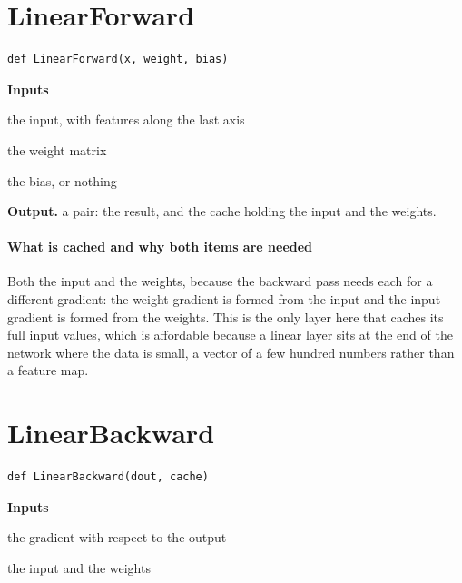 \section{LinearForward}
\begin{lstlisting}[style=sig]
def LinearForward(x, weight, bias)
\end{lstlisting}

\noindent\textbf{Inputs}
\begin{description}[leftmargin=2.2em,style=nextline,font=\normalfont\ttfamily]\setlength\itemsep{1pt}
  \item[{x}] \normalfont the input, with features along the last axis
  \item[{weight}] \normalfont the weight matrix
  \item[{bias}] \normalfont the bias, or nothing
\end{description}

\noindent\textbf{Output.} a pair: the result, and the cache holding the input and the weights.


\paragraph{What is cached and why both items are needed}
Both the input and the weights, because the backward pass needs each for a different gradient: the weight gradient is formed from the input and the input gradient is formed from the weights. This is the only layer here that caches its full input values, which is affordable because a linear layer sits at the end of the network where the data is small, a vector of a few hundred numbers rather than a feature map.


\section{LinearBackward}
\begin{lstlisting}[style=sig]
def LinearBackward(dout, cache)
\end{lstlisting}

\noindent\textbf{Inputs}
\begin{description}[leftmargin=2.2em,style=nextline,font=\normalfont\ttfamily]\setlength\itemsep{1pt}
  \item[{dout}] \normalfont the gradient with respect to the output
  \item[{cache}] \normalfont the input and the weights
\end{description}

